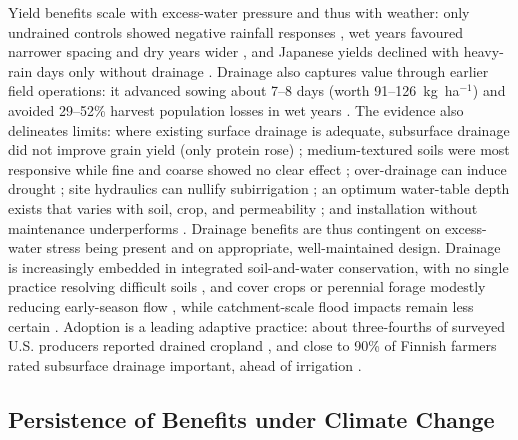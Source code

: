 Yield benefits scale with excess-water pressure and thus with weather: only
undrained controls showed negative rainfall responses
\parencite{Rui2024,JORJANI1991}, wet years favoured narrower spacing and dry years
wider \parencite{Kladivko2005,Acharya2019,CAMP1982,Cordeiro2015}, and Japanese
yields declined with heavy-rain days only without drainage \parencite{Takeshima2023}.
Drainage also captures value through earlier field operations: it advanced sowing
about 7--8 days (worth 91--126~kg~ha$^{-1}$) \parencite{Mourtzinis2021} and avoided
29--52\% harvest population losses in wet years \parencite{Nelson2011}. The
evidence also delineates limits: where existing surface drainage is adequate,
subsurface drainage did not improve grain yield (only protein rose)
\parencite{Wiersma2010}; medium-textured soils were most responsive while fine and
coarse showed no clear effect \parencite{Singh2022b}; over-drainage can induce
drought \parencite{Cordeiro2015,DeBoer2006}; site hydraulics can nullify
subirrigation \parencite{Gunn2018,Gunn2019}; an optimum water-table depth exists
that varies with soil, crop, and permeability
\parencite{HOOGHOUDT1952,Bigelow2001}; and installation without maintenance
underperforms \parencite{Malota2016}. Drainage benefits are thus contingent on
excess-water stress being present and on appropriate, well-maintained design.
Drainage is increasingly embedded in integrated soil-and-water conservation, with
no single practice resolving difficult soils
\parencite{GARDNER1992,Manik2019,Li2021b,Rui2024}, and cover crops or perennial
forage modestly reducing early-season flow \parencite{Goeken2015,Daigh2014}, while
catchment-scale flood impacts remain less certain \parencite{Rogger2017}. Adoption
is a leading adaptive practice: about three-fourths of surveyed U.S. producers
reported drained cropland \parencite{Morton2015}, and close to 90\% of Finnish
farmers rated subsurface drainage important, ahead of irrigation
\parencite{PeltonenSainio2021}.

\subsection{Persistence of Benefits under Climate Change}

